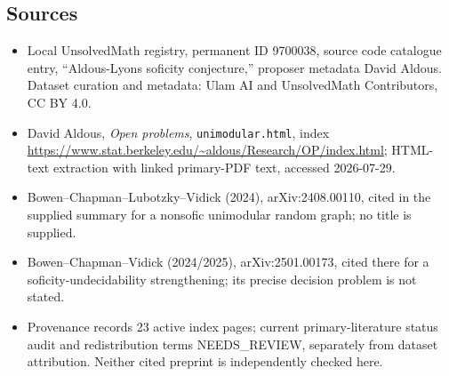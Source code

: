\documentclass[11pt]{article}
\begin{document}
\subsection{Sources}
\begin{itemize}
\item Local UnsolvedMath registry, permanent ID 9700038, source code catalogue entry, ``Aldous-Lyons soficity conjecture,'' proposer metadata David Aldous. Dataset curation and metadata: Ulam AI and UnsolvedMath Contributors, CC BY 4.0.
\item David Aldous, \emph{Open problems}, \texttt{unimodular.html}, index \url{https://www.stat.berkeley.edu/~aldous/Research/OP/index.html}; HTML-text extraction with linked primary-PDF text, accessed 2026-07-29.
\item Bowen--Chapman--Lubotzky--Vidick (2024), arXiv:2408.00110, cited in the supplied summary for a nonsofic unimodular random graph; no title is supplied.
\item Bowen--Chapman--Vidick (2024/2025), arXiv:2501.00173, cited there for a soficity-undecidability strengthening; its precise decision problem is not stated.
\item Provenance records 23 active index pages; current primary-literature status audit and redistribution terms NEEDS\_REVIEW, separately from dataset attribution. Neither cited preprint is independently checked here.
\end{itemize}
\end{document}
